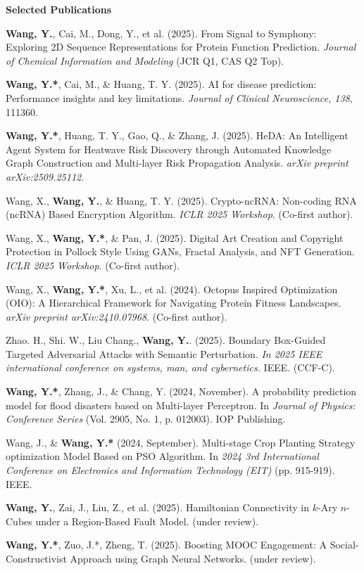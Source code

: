\documentclass[11pt]{article}
\begin{document}
	\begin{center}
		\textbf{\large Selected Publications}
	\end{center}
	\begin{enumerate}[noitemsep, topsep=0pt, partopsep=0pt, parsep=0pt, leftmargin=*, label={[\arabic*]}]
		\item \textbf{Wang, Y.}, Cai, M., Dong, Y., et al. (2025). From Signal to Symphony: Exploring 2D Sequence Representations for Protein Function Prediction. \textit{Journal of Chemical Information and Modeling} (JCR Q1, CAS Q2 Top).
		\item \textbf{Wang, Y.*}, Cai, M., \& Huang, T. Y. (2025). AI for disease prediction: Performance insights and key limitations. \textit{Journal of Clinical Neuroscience, 138}, 111360.
		\item \textbf{Wang, Y.*}, Huang, T. Y., Gao, Q., \& Zhang, J. (2025). HeDA: An Intelligent Agent System for Heatwave Risk Discovery through Automated Knowledge Graph Construction and Multi-layer Risk Propagation Analysis. \textit{arXiv preprint arXiv:2509.25112}.
		\item Wang, X., \textbf{Wang, Y.}, \& Huang, T. Y. (2025). Crypto-ncRNA: Non-coding RNA (ncRNA) Based Encryption Algorithm. \textit{ICLR 2025 Workshop}. (Co-first author).
		\item Wang, X., \textbf{Wang, Y.*}, \& Pan, J. (2025). Digital Art Creation and Copyright Protection in Pollock Style Using GANs, Fractal Analysis, and NFT Generation. \textit{ICLR 2025 Workshop}. (Co-first author).
		\item Wang, X., \textbf{Wang, Y.*}, Xu, L., et al. (2024). Octopus Inspired Optimization (OIO): A Hierarchical Framework for Navigating Protein Fitness Landscapes. \textit{arXiv preprint arXiv:2410.07968}. (Co-first author).
		\item Zhao. H., Shi. W., Liu Chang., \textbf{Wang, Y.}. (2025). Boundary Box-Guided Targeted Adversarial Attacks with Semantic Perturbation. \textit{In 2025 IEEE international conference on systems, man, and cybernetics.} IEEE.  (CCF-C).
		\item \textbf{Wang, Y.*}, Zhang, J., \& Chang, Y. (2024, November). A probability prediction model for flood disasters based on Multi-layer Perceptron. In \textit{Journal of Physics: Conference Series} (Vol. 2905, No. 1, p. 012003). IOP Publishing.
		\item Wang, J., \& \textbf{Wang, Y.*} (2024, September). Multi-stage Crop Planting Strategy optimization Model Based on PSO Algorithm. In \textit{2024 3rd International Conference on Electronics and Information Technology (EIT)} (pp. 915-919). IEEE.
		\item \textbf{Wang, Y.}, Zai, J., Liu, Z., et al. (2025). Hamiltonian Connectivity in $k$-Ary $n$-Cubes under a Region-Based Fault Model. (under review).
		\item \textbf{Wang, Y.*}, Zuo, J.*, Zheng, T. (2025). Boosting MOOC Engagement: A Social-Constructivist Approach using Graph Neural Networks. (under review).
	\end{enumerate}
	
\end{document}

